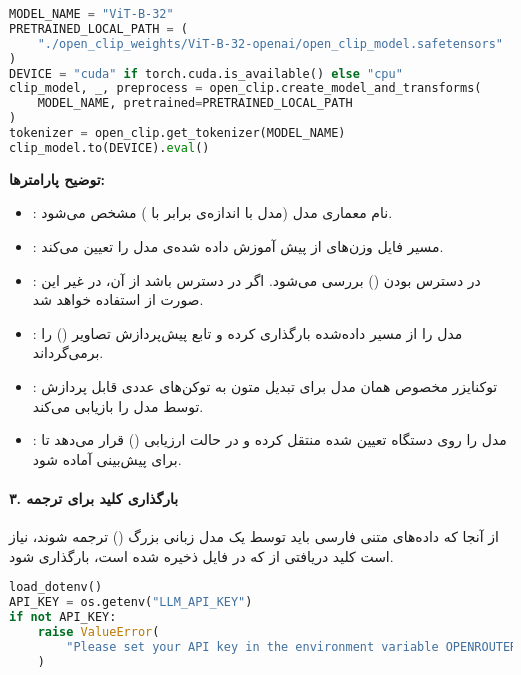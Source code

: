 \documentclass{article}
\begin{document}
\begin{latin}
\begin{lstlisting}[language=Python]
MODEL_NAME = "ViT-B-32"
PRETRAINED_LOCAL_PATH = (
    "./open_clip_weights/ViT-B-32-openai/open_clip_model.safetensors"
)
DEVICE = "cuda" if torch.cuda.is_available() else "cpu"
clip_model, _, preprocess = open_clip.create_model_and_transforms(
    MODEL_NAME, pretrained=PRETRAINED_LOCAL_PATH
)
tokenizer = open_clip.get_tokenizer(MODEL_NAME)
clip_model.to(DEVICE).eval()
\end{lstlisting}
\end{latin}

\textbf{توضیح پارامترها:}
\begin{itemize}
    \item {}: نام معماری مدل  (مدل  با اندازه‌ی  برابر با ) مشخص می‌شود.
    \item {}: مسیر فایل وزن‌های از پیش آموزش داده شده‌ی مدل را تعیین می‌کند.
    \item {}: در دسترس بودن  () بررسی می‌شود. اگر  در دسترس باشد از آن، در غیر این صورت از  استفاده خواهد شد.
    \item {}: مدل  را از مسیر داده‌شده بارگذاری کرده و تابع پیش‌پردازش تصاویر () را برمی‌گرداند.
    \item {}: توکنایزر مخصوص همان مدل برای تبدیل متون به توکن‌های عددی قابل پردازش توسط مدل را بازیابی می‌کند.
    \item {}: مدل را روی دستگاه تعیین شده منتقل کرده و در حالت ارزیابی () قرار می‌دهد تا برای پیش‌بینی آماده شود.
\end{itemize}

\paragraph{۳. بارگذاری کلید  برای ترجمه}

از آنجا که داده‌های متنی فارسی باید توسط یک مدل زبانی بزرگ () ترجمه شوند، نیاز است کلید  دریافتی از  که در فایل  ذخیره شده است، بارگذاری شود.

\begin{latin}
\begin{lstlisting}[language=Python]
load_dotenv()
API_KEY = os.getenv("LLM_API_KEY")
if not API_KEY:
    raise ValueError(
        "Please set your API key in the environment variable OPENROUTER_API_KEY."
    )
\end{lstlisting}
\end{latin}
\end{document}
